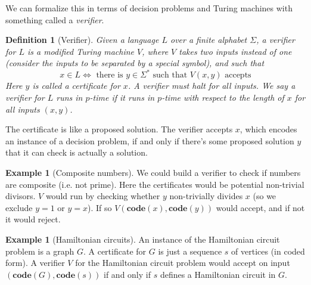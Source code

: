 \documentclass{article}
\theoremstyle{plain}
\newtheorem{definition}[theorem]{Definition}{\bfseries}{\upshape}
\theoremstyle{definition}
\newtheorem{example}[theorem]{Example}{\bfseries}{\upshape}
\newcommand{\co}{\mathbf{code}}
\begin{document}
We can formalize this in terms of decision problems and Turing machines with something called a \emph{verifier}.

\begin{definition}[Verifier]
Given a language $L$ over a finite alphabet $\Sigma$, a verifier for $L$ is a modified Turing machine $V$, where $V$ takes two inputs instead of one (consider the inputs to be separated by a special symbol), and such that
\[x\in L\iff \text{ there is } y\in\Sigma^* \text{ such that } V(x,y) \text{ accepts}\]
Here $y$ is called a \emph{certificate} for $x$. A verifier must halt for all inputs. We say a verifier for $L$ runs in $p$-time if it runs in $p$-time with respect to the length of $x$ for all inputs $(x,y)$.  
\end{definition}
The certificate is like a proposed solution. The verifier accepts $x$, which encodes an instance of a decision problem, if and only if there's some proposed solution $y$ that it can check is actually a solution. 

\begin{example}[Composite numbers]
We could build a verifier to check if numbers are composite (i.e. not prime). Here the certificates would be potential non-trivial divisors. $V$ would run by checking whether $y$ non-trivially divides $x$ (so we exclude $y=1$ or $y=x$). If so $V(\co(x),\co(y))$ would accept, and if not it would reject.
\end{example}  

\begin{example}[Hamiltonian circuits]
An instance of the Hamiltonian circuit problem is a graph $G$. A certificate for $G$ is just a sequence $s$ of vertices (in coded form). A verifier $V$ for the Hamiltonian  circuit problem would accept on input $(\co(G),\co(s))$ if and only if $s$ defines a Hamiltonian circuit in $G$. 
\end{example}
\end{document}
